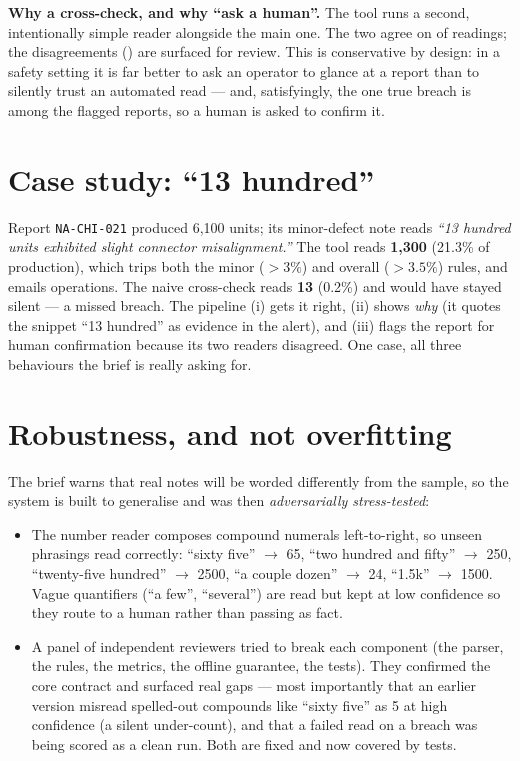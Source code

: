 \documentclass[11pt]{article}
\newcommand{\code}[1]{\texttt{\small #1}}
\begin{document}
\noindent\textbf{Why a cross-check, and why ``ask a human''.} The tool runs a second,
intentionally simple reader alongside the main one. The two agree on \baselineAgreement{}
of readings; the \reportsFlagged{} disagreements (\flaggedSites) are surfaced for review.
This is conservative by design: in a safety setting it is far better to ask an operator to
glance at a report than to silently trust an automated read --- and, satisfyingly, the one
true breach is among the flagged reports, so a human is asked to confirm it.

\section{Case study: ``13 hundred''}
Report \code{NA-CHI-021} produced 6{,}100 units; its minor-defect note reads
\emph{``13 hundred units exhibited slight connector misalignment.''} The tool reads
\textbf{1{,}300} (21.3\% of production), which trips both the minor ($>3\%$) and overall
($>3.5\%$) rules, and emails operations. The naive cross-check reads \textbf{13} (0.2\%)
and would have stayed silent --- a missed breach. The pipeline (i) gets it right, (ii)
shows \emph{why} (it quotes the snippet ``13 hundred'' as evidence in the alert), and
(iii) flags the report for human confirmation because its two readers disagreed. One case,
all three behaviours the brief is really asking for.

\section{Robustness, and not overfitting}
The brief warns that real notes will be worded differently from the sample, so the system
is built to generalise and was then \emph{adversarially stress-tested}:

\begin{itemize}[leftmargin=1.4em,itemsep=2pt]
  \item The number reader composes compound numerals left-to-right, so unseen phrasings
    read correctly: ``sixty five'' $\to$ 65, ``two hundred and fifty'' $\to$ 250,
    ``twenty-five hundred'' $\to$ 2500, ``a couple dozen'' $\to$ 24, ``1.5k'' $\to$ 1500.
    Vague quantifiers (``a few'', ``several'') are read but kept at low confidence so they
    route to a human rather than passing as fact.
  \item A panel of independent reviewers tried to break each component (the parser, the
    rules, the metrics, the offline guarantee, the tests). They confirmed the core
    contract and surfaced real gaps --- most importantly that an earlier version misread
    spelled-out compounds like ``sixty five'' as 5 at high confidence (a silent
    under-count), and that a failed read on a breach was being scored as a clean run.
    Both are fixed and now covered by tests.
\end{itemize}
\end{document}
